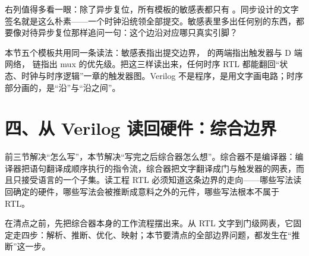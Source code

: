 右列值得多看一眼：除了异步复位，所有模板的敏感表都只有 。同步设计的文字签名就是这么朴素——一个时钟沿统领全部提交。敏感表里多出任何别的东西，都要像对待异步复位那样追问一句：这个边沿对应哪只真实引脚？

本节五个模板共用同一条读法：敏感表指出提交边界，\code{<=} 的两端指出触发器与 D 端网络， 链指出 mux 的优先级。把这三样读出来，任何时序 RTL 都能翻回“状态、时钟与时序逻辑”一章的触发器图。Verilog 不是程序，是用文字画电路；时序部分画的，是“沿”与“沿之间”。

\section{四、从 Verilog 读回硬件：综合边界}

前三节解决“怎么写”，本节解决“写完之后综合器怎么想”。综合器不是编译器：编译器把语句翻译成顺序执行的指令流，综合器把文字翻译成门与触发器的网表，而且只接受语言的一个子集。读工程 RTL 必须知道这条边界的走向——哪些写法读回确定的硬件，哪些写法会被推断成意料之外的元件，哪些写法根本不属于 RTL。

在清点之前，先把综合器本身的工作流程摆出来。从 RTL 文字到门级网表，它固定走四步：解析、推断、优化、映射；本节要清点的全部边界问题，都发生在“推断”这一步。

